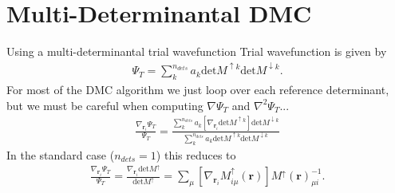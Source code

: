 \documentclass{beamer}
\begin{document}
\section{Multi-Determinantal DMC}
\begin{frame}{Using a multi-determinantal trial wavefunction}
  Trial wavefunction is given by
    \small{\begin{align}
    \Psi_T = \sum_k^{n_{dets}} a_k \mathrm{det} M^{\uparrow k} \mathrm{det} M^{\downarrow k}.
  \end{align}}
 \hspace{-0.27em}For most of the DMC algorithm we just loop over each reference determinant, but we must be careful when computing $\nabla \Psi_T$ and $\nabla^2 \Psi_T$...
  \small{\begin{align}
     \frac{\nabla_{\mathbf{r}_i} \Psi_T}{\Psi_T} = \frac{ \sum_k^{n_{dets}} a_k \left[ \nabla_{\mathbf{r}_i}  \mathrm{det} M^{\uparrow k} \right] \mathrm{det} M^{\downarrow k}}{ \sum_k^{n_{dets}} a_k \mathrm{det} M^{\uparrow k} \mathrm{det} M^{\downarrow k}}
  \end{align}}
  In the standard case ($n_{dets} = 1$) this reduces to 
  \small{\begin{align}
     \frac{\nabla_{\mathbf{r}_i} \Psi_T}{\Psi_T} = \frac{\nabla_{\mathbf{r}_i}   \mathrm{det} M^{\uparrow}}{  \mathrm{det} M^{\uparrow}} = \sum_{\mu} \left[ \nabla_{\mathbf{r}_i} M^{\uparrow}_{i \mu}(\mathbf{r}) \right]  M^{\uparrow}(\mathbf{r})^{-1}_{\mu i}.
  \end{align}}

  
\end{frame}
\end{document}

